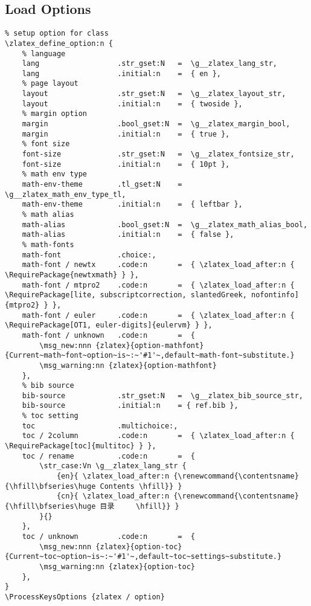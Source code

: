 \subsection{Load Options}
\begin{verbatim}
% setup option for class 
\zlatex_define_option:n {
    % language
    lang                  .str_gset:N   =  \g__zlatex_lang_str,
    lang                  .initial:n    =  { en },
    % page layout
    layout                .str_gset:N   =  \g__zlatex_layout_str,
    layout                .initial:n    =  { twoside },
    % margin option
    margin                .bool_gset:N  =  \g__zlatex_margin_bool,
    margin                .initial:n    =  { true },
    % font size
    font-size             .str_gset:N   =  \g__zlatex_fontsize_str,
    font-size             .initial:n    =  { 10pt },
    % math env type
    math-env-theme        .tl_gset:N    =  \g__zlatex_math_env_type_tl,
    math-env-theme        .initial:n    =  { leftbar },
    % math alias
    math-alias            .bool_gset:N  =  \g__zlatex_math_alias_bool,
    math-alias            .initial:n    =  { false },
    % math-fonts
    math-font             .choice:,
    math-font / newtx     .code:n       =  { \zlatex_load_after:n { \RequirePackage{newtxmath} } },
    math-font / mtpro2    .code:n       =  { \zlatex_load_after:n { \RequirePackage[lite, subscriptcorrection, slantedGreek, nofontinfo]{mtpro2} } },
    math-font / euler     .code:n       =  { \zlatex_load_after:n { \RequirePackage[OT1, euler-digits]{eulervm} } },
    math-font / unknown   .code:n       =  {
        \msg_new:nnn {zlatex}{option-mathfont}{Current~math~font~option~is~:~'#1'~,default~math-font~substitute.}
        \msg_warning:nn {zlatex}{option-mathfont}
    },
    % bib source
    bib-source            .str_gset:N   =  \g__zlatex_bib_source_str,
    bib-source            .initial:n    = { ref.bib },
    % toc setting
    toc                   .multichoice:,
    toc / 2column         .code:n       =  { \zlatex_load_after:n { \RequirePackage[toc]{multitoc} } },
    toc / rename          .code:n       =  { 
        \str_case:Vn \g__zlatex_lang_str {
            {en}{ \zlatex_load_after:n {\renewcommand{\contentsname}{\hfill\bfseries\huge Contents \hfill}} }
            {cn}{ \zlatex_load_after:n {\renewcommand{\contentsname}{\hfill\bfseries\huge 目录     \hfill}} }
        }{}
    },
    toc / unknown         .code:n       =  {
        \msg_new:nnn {zlatex}{option-toc}{Current~toc~option~is~:~'#1'~,default~toc~settings~substitute.}
        \msg_warning:nn {zlatex}{option-toc}
    },
}
\ProcessKeysOptions {zlatex / option}
\end{verbatim}

